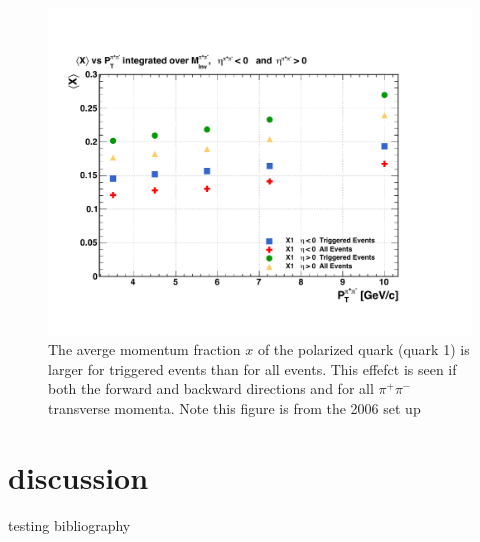 \documentclass[abstract = on,listof=totoc, bibliography=totoc]{scrreprt}
\newcommand{\pip}{\pi^+}
\newcommand{\pim}{\pi^-}
\newcommand{\pair}{$\pip\pim$ }
\begin{document}
\begin{figure}
\begin{center}
\includegraphics[width = 1\textwidth]{TriggerBiasXHiQualColor}
\caption[Trigger bias toward higher momentum fraction $x$ events]{The averge momentum fraction $x$ of the polarized quark (quark 1) is larger for triggered events than for all events. This effefct is seen if both the forward and backward directions and for all \pair transverse momenta. Note this figure is from the 2006 set up}
\label{fig:TriggerBiasXHiQualColor}
\end{center}
\end{figure}


\chapter{discussion}


testing bibliography \cite{ppCollider}\cite{hermesHel}\cite{extractIFF}\cite{belleIFF}\cite{BEMC}\cite{TPC}\cite{magnet}\cite{STARoverview}\cite{RHICoverview}\cite{compassRes}\cite{hermesRes}\cite{crossRatio}

\printbibliography
%
%
%
%
\end{document}
